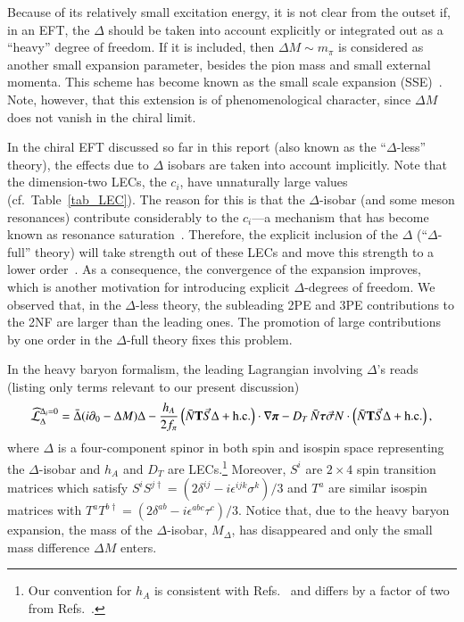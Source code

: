 \documentclass[sort&compress,preprint,3p]{elsarticle}
\begin{document}
Because of its relatively small excitation energy, it is not clear from the outset if, 
in an EFT, the $\Delta$ should be taken into account explicitly or integrated out as
a ``heavy'' degree of freedom. If it is included, then $\Delta M \sim m_\pi$ is considered
as another small expansion parameter, besides the pion mass and small external momenta.
This scheme has become known as the small scale expansion (SSE)~\cite{HHK98}.
Note, however, that this extension is of phenomenological character, since
$\Delta M$ does not vanish in the chiral limit.

In the chiral EFT discussed so far in this report 
(also known as the ``$\Delta$-less'' theory),
the effects due to $\Delta$ isobars
are taken into account implicitly. Note that the dimension-two LECs, the $c_i$,
have unnaturally large values (cf.\ Table~\ref{tab_LEC}). The reason for this is that
the $\Delta$-isobar (and some meson resonances) contribute considerably
to the $c_i$---a mechanism that has become known as
resonance saturation~\cite{BKM97}.
Therefore, the explicit inclusion of the $\Delta$ (``$\Delta$-full'' theory) will take strength out of these
LECs and move this strength to a lower order~\cite{OK92,ORK94,KGW98,KEM07,EKM08}. 
As a consequence, the convergence of the expansion improves, which
is another motivation for introducing explicit $\Delta$-degrees of freedom.
We observed that, in the $\Delta$-less theory, the subleading 2PE and 3PE contributions
to the 2NF are larger than the leading ones. The promotion of large contributions
by one order in the $\Delta$-full theory fixes this problem. 

In the heavy baryon formalism, the leading Lagrangian involving $\Delta$'s 
reads~\cite{Kol94,ORK96}
(listing only terms relevant to our present discussion)
\begin{equation}
\widehat{\cal L}^{\Delta_i=0}_\Delta = 
\bar{\Delta} (i \partial_0 - \Delta M) \Delta 
- \frac{h_A}{2f_\pi}  \left(\bar{N} {\bf T} {\vec S}  \Delta + \mbox{h.c.} \right) 
 \cdot \nabla \mbox{\boldmath ${\bf \pi}$}
-D_T \, \bar{N} \mbox{\boldmath ${\bf \tau}$} {\vec \sigma} N  \cdot
\left( \bar{N} {\bf T} {\vec S} \Delta + \mbox{h.c.} \right) ,
\end{equation}
where $\Delta$ is a four-component spinor in both spin and isospin space representing
the $\Delta$-isobar and $h_A$ and $D_T$ are LECs.\footnote{Our convention for $h_A$
is consistent with Refs.~\cite{Kol94,ORK96,KGW98,Epe06} and differs by a factor of two from
Refs.~\cite{HHK98,FM01,KEM07}.}
Moreover, $S^i$ are $2\times 4$ spin transition matrices
which satisfy $S^iS^{j\dagger}=(2\delta^{ij}-i\epsilon^{ijk}\sigma^k)/3$ and
$T^a$ are similar isospin matrices with
$T^aT^{b\dagger}=(2\delta^{ab}-i\epsilon^{abc}\tau^c)/3$. 
Notice that, due to the heavy baryon expansion, the mass of the $\Delta$-isobar, $M_\Delta$,
has disappeared and only the small mass difference $\Delta M$ enters. 
\end{document}
